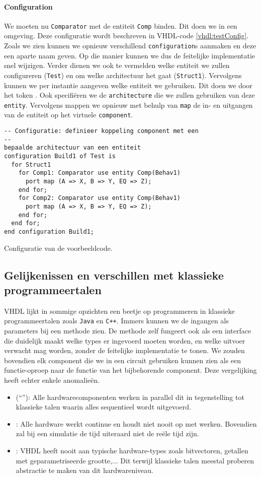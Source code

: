 \paragraph{Configuration} We moeten nu \texttt{Comparator} met de entiteit \texttt{Comp} binden. Dit doen we in een  omgeving. Deze configuratie wordt beschreven in VHDL-code \ref{vhdl:testConfig}. Zoals we zien kunnen we opnieuw verschillend \texttt{configuration}s aanmaken en deze een aparte naam geven. Op die manier kunnen we dus de feitelijke implementatie snel wijzigen. Verder dienen we ook te vermelden welke entiteit we zullen configureren (\texttt{Test}) en om welke architectuur het gaat (\texttt{Struct1}). Vervolgens kunnen we per instantie aangeven welke entiteit we gebruiken. Dit doen we door het token . Ook specifi\"eren we de \texttt{architecture} die we zullen gebruiken van deze \texttt{entity}. Vervolgens mappen we opnieuw met behulp van \texttt{map} de in- en uitgangen van de entiteit op het virtuele \texttt{component}.
\begin{vhdlcode}
\begin{lstlisting}
-- Configuratie: definieer koppeling component met een
--
bepaalde architectuur van een entiteit
configuration Build1 of Test is
  for Struct1
    for Comp1: Comparator use entity Comp(Behav1)
      port map (A => X, B => Y, EQ => Z);
    end for;
    for Comp2: Comparator use entity Comp(Behav1)
      port map (A => X, B => Y, EQ => Z);
    end for;
  end for;
end configuration Build1;
\end{lstlisting}
\caption{Configuratie van de voorbeeldcode.}
\label{vhdl:testConfig}
\end{vhdlcode}
\subsection{Gelijkenissen en verschillen met klassieke programmeertalen}
VHDL lijkt in sommige opzichten een beetje op programmeren in klassieke programmeertalen zoals \texttt{Java} en \texttt{C++}. Immers kunnen we de ingangen als parameters bij een methode zien. De methode zelf fungeert ook als een interface die duidelijk maakt welke types er ingevoerd moeten worden, en welke uitvoer verwacht mag worden, zonder de feitelijke implementatie te tonen. We zouden bovendien elk component die we in een circuit gebruiken kunnen zien als een functie-oproep naar de functie van het bijbehorende component. Deze vergelijking heeft echter enkele anomalie\"en.
\begin{itemize}
 \item {} (``''): Alle hardwarecomponenten werken in parallel dit in tegenstelling tot klassieke talen waarin alles sequentieel wordt uitgevoerd.
 \item {}: Alle hardware werkt continue en houdt niet nooit op met werken. Bovendien zal bij een simulatie de tijd uiteraard niet de re\"ele tijd zijn.
 \item {}: VHDL heeft nooit aan typische hardware-types zoals bitvectoren, getallen met geparametriseerde grootte,... Dit terwijl klassieke talen meestal proberen abstractie te maken van dit hardwareniveau.
\end{itemize}
